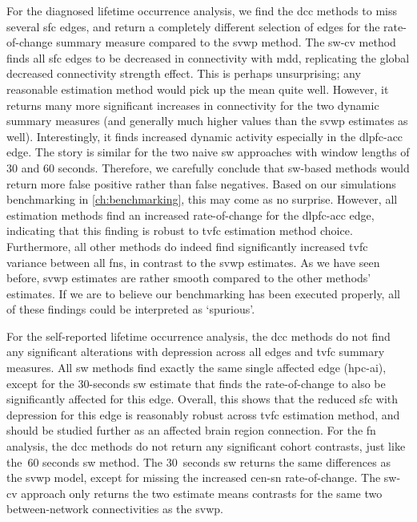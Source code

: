 For the diagnosed lifetime occurrence analysis, we find the \gls{dcc} methods to miss several \gls{sfc} edges, and return a completely different selection of edges for the rate-of-change summary measure compared to the \gls{svwp} method.
%
The \gls{sw-cv} method finds all \gls{sfc} edges to be decreased in connectivity with \gls{mdd}, replicating the global decreased connectivity strength effect.
This is perhaps unsurprising; any reasonable estimation method would pick up the mean quite well.
However, it returns many more significant increases in connectivity for the two dynamic summary measures (and generally much higher values than the \gls{svwp} estimates as well).
Interestingly, it finds increased dynamic activity especially in the \gls{dlpfc}-\gls{acc} edge.
%
The story is similar for the two naive \gls{sw} approaches with window lengths of 30 and 60 seconds.
Therefore, we carefully conclude that \gls{sw}-based methods would return more false positive rather than false negatives.
Based on our simulations benchmarking in \cref{ch:benchmarking}, this may come as no surprise.
%
However, all estimation methods find an increased rate-of-change for the \gls{dlpfc}-\gls{acc} edge, indicating that this finding is robust to \gls{tvfc} estimation method choice.
%
Furthermore, all other methods do indeed find significantly increased \gls{tvfc} variance between all \glspl{fn}, in contrast to the \gls{svwp} estimates.
As we have seen before, \gls{svwp} estimates are rather smooth compared to the other methods' estimates.
If we are to believe our benchmarking has been executed properly, all of these findings could be interpreted as `spurious'.

For the self-reported lifetime occurrence analysis, the \gls{dcc} methods do not find any significant alterations with depression across all edges and \gls{tvfc} summary measures.
%
All \gls{sw} methods find exactly the same single affected edge (\gls{hpc}-\gls{ai}), except for the 30-seconds \gls{sw} estimate that finds the rate-of-change to also be significantly affected for this edge.
%
Overall, this shows that the reduced \gls{sfc} with depression for this edge is reasonably robust across \gls{tvfc} estimation method, and should be studied further as an affected brain region connection.
%
For the \gls{fn} analysis, the \gls{dcc} methods do not return any significant cohort contrasts, just like the~60 seconds \gls{sw} method.
The 30~seconds \gls{sw} returns the same differences as the \gls{svwp} model, except for missing the increased \gls{cen}-\gls{sn} rate-of-change.
The \gls{sw-cv} approach only returns the two estimate means contrasts for the same two between-network connectivities as the \gls{svwp}.

